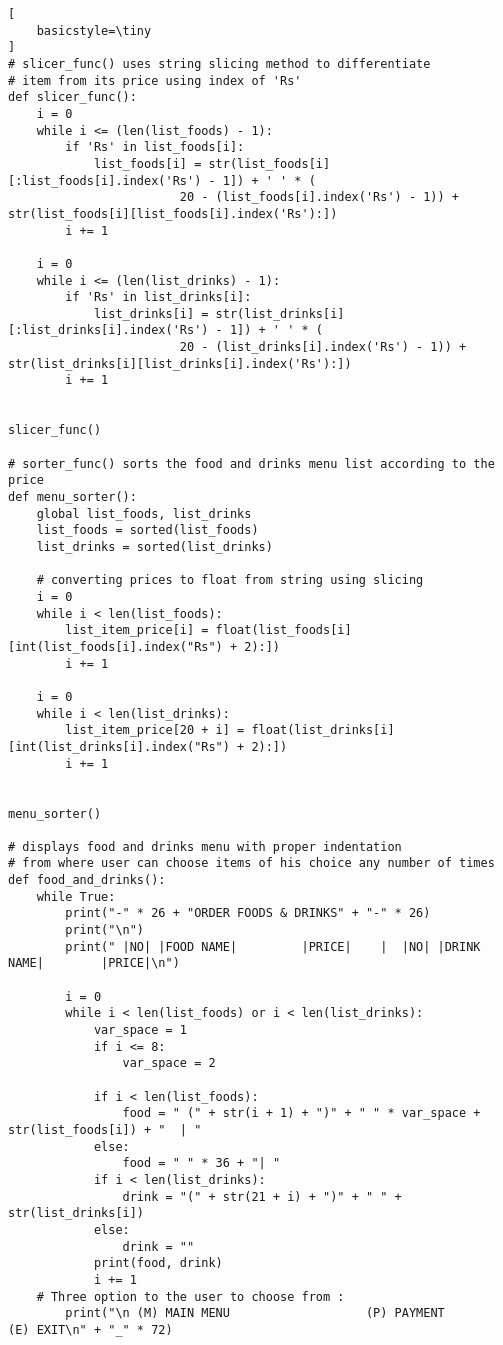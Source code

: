 \documentclass[11pt, a4paper]{article}
\begin{document}
\begin{lstlisting}[
    basicstyle=\tiny
]
# slicer_func() uses string slicing method to differentiate
# item from its price using index of 'Rs'
def slicer_func():
    i = 0
    while i <= (len(list_foods) - 1):
        if 'Rs' in list_foods[i]:
            list_foods[i] = str(list_foods[i][:list_foods[i].index('Rs') - 1]) + ' ' * (
                        20 - (list_foods[i].index('Rs') - 1)) + str(list_foods[i][list_foods[i].index('Rs'):])
        i += 1

    i = 0
    while i <= (len(list_drinks) - 1):
        if 'Rs' in list_drinks[i]:
            list_drinks[i] = str(list_drinks[i][:list_drinks[i].index('Rs') - 1]) + ' ' * (
                        20 - (list_drinks[i].index('Rs') - 1)) + str(list_drinks[i][list_drinks[i].index('Rs'):])
        i += 1


slicer_func()

# sorter_func() sorts the food and drinks menu list according to the price
def menu_sorter():
    global list_foods, list_drinks
    list_foods = sorted(list_foods)
    list_drinks = sorted(list_drinks)

    # converting prices to float from string using slicing
    i = 0
    while i < len(list_foods):
        list_item_price[i] = float(list_foods[i][int(list_foods[i].index("Rs") + 2):])
        i += 1

    i = 0
    while i < len(list_drinks):
        list_item_price[20 + i] = float(list_drinks[i][int(list_drinks[i].index("Rs") + 2):])
        i += 1


menu_sorter()

# displays food and drinks menu with proper indentation
# from where user can choose items of his choice any number of times
def food_and_drinks():
    while True:
        print("-" * 26 + "ORDER FOODS & DRINKS" + "-" * 26)
        print("\n")
        print(" |NO| |FOOD NAME|         |PRICE|    |  |NO| |DRINK NAME|        |PRICE|\n")

        i = 0
        while i < len(list_foods) or i < len(list_drinks):
            var_space = 1
            if i <= 8:
                var_space = 2

            if i < len(list_foods):
                food = " (" + str(i + 1) + ")" + " " * var_space + str(list_foods[i]) + "  | "
            else:
                food = " " * 36 + "| "
            if i < len(list_drinks):
                drink = "(" + str(21 + i) + ")" + " " + str(list_drinks[i])
            else:
                drink = ""
            print(food, drink)
            i += 1
    # Three option to the user to choose from :
        print("\n (M) MAIN MENU                   (P) PAYMENT                   (E) EXIT\n" + "_" * 72)


\end{lstlisting}
\end{document}
